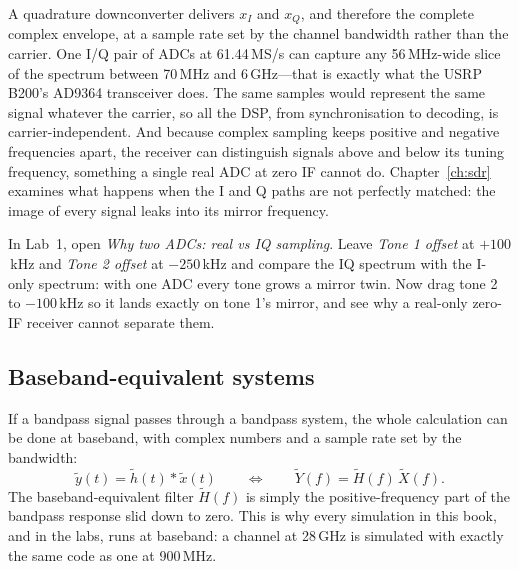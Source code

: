 \begin{keyidea}
A quadrature downconverter delivers $x_I$ and $x_Q$, and therefore the complete complex envelope,
at a sample rate set by the channel bandwidth rather than the carrier. One I/Q pair of ADCs at
61.44\,MS/s can capture any 56\,MHz-wide slice of the spectrum between 70\,MHz and 6\,GHz---that is
exactly what the USRP B200's AD9364 transceiver does. The same samples would represent the same
signal whatever the carrier, so all the DSP, from synchronisation to decoding, is carrier-independent.
And because complex sampling keeps positive and negative frequencies apart, the receiver can
distinguish signals above and below its tuning frequency, something a single real ADC at zero IF
cannot do. Chapter~\ref{ch:sdr} examines what happens when the I and Q paths are not perfectly
matched: the image of every signal leaks into its mirror frequency.
\end{keyidea}


\begin{tryit}
In Lab~1, open \emph{Why two ADCs: real vs IQ sampling}. Leave \emph{Tone 1 offset} at $+100$\,kHz
and \emph{Tone 2 offset} at $-250$\,kHz and compare the IQ spectrum with the I-only spectrum: with one
ADC every tone grows a mirror twin. Now drag tone 2 to $-100$\,kHz so it lands exactly on tone 1's
mirror, and see why a real-only zero-IF receiver cannot separate them.
\end{tryit}

\subsection{Baseband-equivalent systems}

If a bandpass signal passes through a bandpass system, the whole calculation can be done at
baseband, with complex numbers and a sample rate set by the bandwidth:
\begin{equation}
\tilde{y}(t)=\tilde{h}(t)*\tilde{x}(t)\qquad\Longleftrightarrow\qquad \tilde Y(f)=\tilde H(f)\,\tilde X(f).
\label{eq:ch02:bbequiv}
\end{equation}
The baseband-equivalent filter $\tilde H(f)$ is simply the positive-frequency part of the bandpass
response slid down to zero. This is why every simulation in this book, and in the labs, runs at
baseband: a channel at 28\,GHz is simulated with exactly the same code as one at 900\,MHz.

